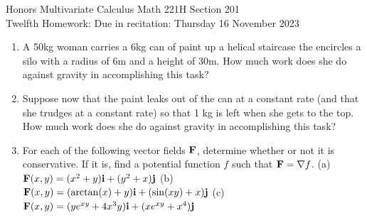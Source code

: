 \documentclass[12pt]{article}
\newcommand{\bfF}{{\bf F}}    %
\newcommand{\bfi}{{\bf i}}    %
\newcommand{\bfj}{{\bf j}}    %
\begin{document}
\LARGE 
\noindent
{\color{Maroon}Honors Multivariate Calculus \hfill Math 221H Section 201}\vspace{2pt}\\
\large
Twelfth Homework:\hfill 
Due in recitation: Thursday 16 November 2023\vspace{2pt}

\normalsize
    \vspace{2pt}

\begin{enumerate}



\item A 50kg woman carries a 6kg can of paint up a helical staircase the encircles a silo with a radius of 6m and a
  height of 30m.
  How much work does she do against gravity in accomplishing this task?\vspace{-2pt}
   
   
\item  Suppose now that the paint leaks out of the can at a constant rate (and that she trudges at a constant rate) so that
  1 kg is left when she gets to the top.
  How much work does she do against gravity in accomplishing this task?
  \vspace{-2pt}

   
\item For each of the following vector fields $\bfF$, determine whether or not it is conservative.
  If it is, find a potential function $f$ such that $\bfF=\nabla f$.\newline 
  (a)\ $\bfF(x,y)=(x^2+y)\bfi + (y^2+x)\bfj$
  \qquad\qquad
  (b)\ $\bfF(x,y)=(\arctan(x)+y)\bfi + (\sin(xy)+x)\bfj$\newline
  (c)\ $\bfF(x,y)=(ye^{xy}+4x^3y)\bfi + (xe^{xy}+x^4)\bfj$
  \vspace{-2pt}


\end{enumerate}
\end{document}
